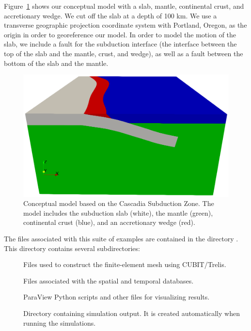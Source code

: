 Figure~\ref{fig:example:subduction:3d:concept} shows our conceptual
model with a slab, mantle, continental crust, and accretionary
wedge. We cut off the slab at a depth of 100 km. We use a transverse
geographic projection coordinate system with Portland, Oregon, as the
origin in order to georeference our model. In order to model the
motion of the slab, we include a fault for the subduction interface
(the interface between the top of the slab and the mantle, crust, and
wedge), as well as a fault between the bottom of the slab and the
mantle.

\begin{figure}[htbp]
  \includegraphics[width=4.5in]{examples/figs/subduction3d_conceptualmodel}
  \caption{Conceptual model based on the Cascadia Subduction Zone. The
    model includes the subduction slab (white), the mantle (green),
    continental crust (blue), and an accretionary wedge (red).}
  \label{fig:example:subduction:3d:concept}
\end{figure}

The files associated with this suite of examples are contained in the
directory . This directory contains
several subdirectories:
\begin{description}
\item[] Files used to construct the finite-element mesh using
  CUBIT/Trelis.
\item[] Files associated with the spatial
  and temporal databases.
\item[] ParaView
  Python scripts and other files for visualizing results.
\item[] Directory containing simulation
  output. It is created automatically when running the
  simulations.
\end{description}


